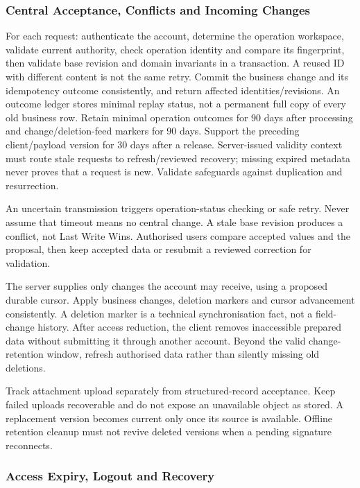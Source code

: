 \subsubsection{Central Acceptance, Conflicts and Incoming Changes}

For each request: authenticate the account, determine the operation workspace,
validate current authority, check operation identity and compare its fingerprint,
then validate base revision and domain invariants in a transaction. A reused ID
with different content is not the same retry. Commit the business change and its
idempotency outcome consistently, and return affected identities/revisions.
An outcome ledger stores minimal replay status, not a permanent full copy of every
old business row. Retain minimal operation outcomes for 90 days after processing
and change/deletion-feed markers for 90 days. Support the preceding client/payload
version for 30 days after a release. Server-issued validity context must route
stale requests to refresh/reviewed recovery; missing expired metadata never proves
that a request is new. Validate safeguards against duplication and resurrection.

An uncertain transmission triggers operation-status checking or safe retry.
Never assume that timeout means no central change. A stale base revision produces
a conflict, not Last Write Wins. Authorised users compare accepted values and the
proposal, then keep accepted data or resubmit a reviewed correction for validation.


The server supplies only changes the account may receive, using a proposed durable
cursor. Apply business changes, deletion markers and cursor advancement consistently.
A deletion marker is a technical synchronisation fact, not a field-change history.
After access reduction, the client removes inaccessible prepared data without
submitting it through another account. Beyond the valid change-retention window,
refresh authorised data rather than silently missing old deletions.

Track attachment upload separately from structured-record acceptance. Keep failed
uploads recoverable and do not expose an unavailable object as stored. A replacement
version becomes current only once its source is available. Offline retention cleanup
must not revive deleted versions when a pending signature reconnects.


\subsubsection{Access Expiry, Logout and Recovery}

